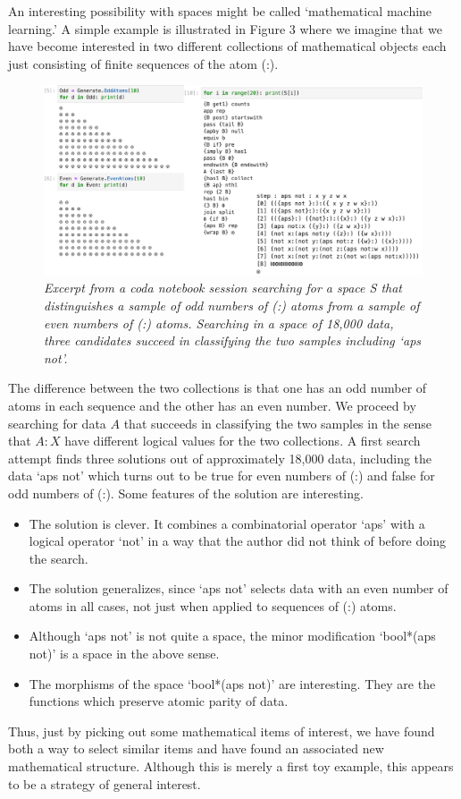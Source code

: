 \documentclass[11pt]{article}
\begin{document}
     An interesting possibility with spaces might be called `mathematical machine learning.'  A simple
example is illustrated in Figure 3 where we imagine that we have become interested in two different
collections of mathematical objects each just consisting of finite sequences of the atom (:).
\begin{figure}[h]
\centering
\includegraphics[width=1.0\textwidth]{machine_learning.png}
\caption{{\it Excerpt from a coda notebook session searching for a space S that distinguishes a sample of
odd numbers of (:) atoms from a sample of even numbers of (:) atoms.  Searching in a space of 18,000 data,
three candidates succeed in classifying the two samples including `aps not'.}}
\end{figure}
The difference between the two collections is that one has an odd number of atoms in each sequence and
the other has an even number.  We proceed by searching for data $A$ that succeeds in classifying
the two samples in the sense that $A:X$ have different logical values for the two collections.   A first search attempt
finds three solutions out of approximately 18,000 data, including the data  `aps not' which turns out to be true for
even numbers of (:) and false for odd numbers of (:).
Some features of the solution are interesting.
\begin{itemize}
\item The solution is clever.  It combines a combinatorial operator `aps' with a logical operator `not'
in a way that the author did not think of before doing the search.
\item The solution generalizes, since `aps not' selects data with an even number of atoms in all cases,
not just when applied to sequences of (:) atoms.
\item Although `aps not' is not quite a space, the minor modification `bool*(aps not)' is a space
in the above sense.
\item The morphisms of the space `bool*(aps not)' are interesting.  They are the functions
which preserve atomic parity of data.
\end{itemize}
Thus, just by picking out some mathematical items of interest, we have found both a way to
select similar items and have found an associated new mathematical structure.
Although this is merely a first toy example, this appears to be a strategy of general interest.
\end{document}
